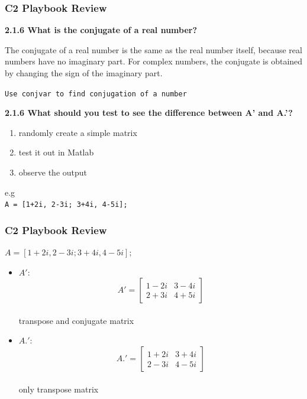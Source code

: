 \documentclass[
	11pt, %
]{beamer}
\begin{document}

\begin{frame}
	\frametitle{C2 Playbook Review}
	\textbf{2.1.6 What is the conjugate of a real number? }
    
    \quad The conjugate of a real number is the same as the real number itself, because real numbers have no imaginary part. For complex numbers, the conjugate is obtained by changing the sign of the imaginary part.

    \texttt{Use conj{var} to find conjugation of a number}

    \bigskip

    \textbf{2.1.6 What should you test to see the difference between A' and A.'? }

    \begin{enumerate}
        \item randomly create a simple matrix 
        \item test it out in Matlab
        \item observe the output
    \end{enumerate}

    e.g\\
    \texttt{A = [1+2i, 2-3i; 3+4i, 4-5i];}
    \end{frame}



\begin{frame}
	\frametitle{C2 Playbook Review}
    \texttt{$A = [1+2i, 2-3i; 3+4i, 4-5i];$}

    \bigskip

    \begin{itemize}
        \item \texttt{$A'$}:
        \\ 
        \[
        A' = \begin{bmatrix}
        1 - 2i & 3 - 4i \\
        2 + 3i & 4 + 5i
        \end{bmatrix}
        \]
        \\ transpose and conjugate matrix
        \item \texttt{$A.'$}:
        \\
        \[
        A.' = \begin{bmatrix}
        1 + 2i & 3 + 4i \\
        2 - 3i & 4 - 5i
        \end{bmatrix}
        \]
        \\ only transpose matrix
    \end{itemize}
    \end{frame}
\end{document}
